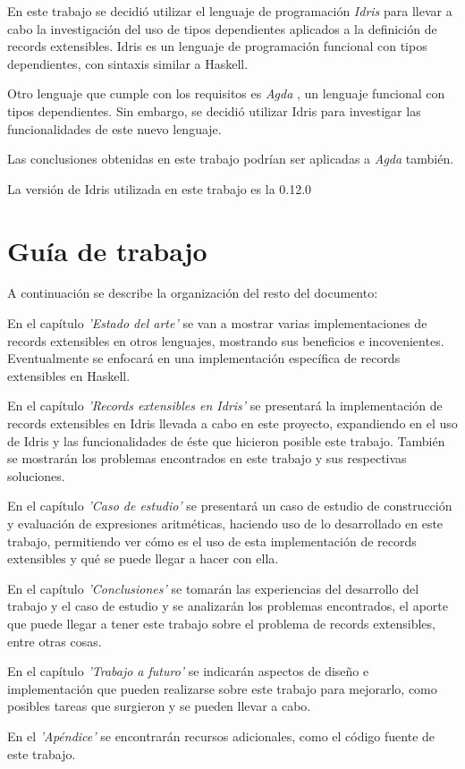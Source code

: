 En este trabajo se decidió utilizar el lenguaje de programación \textit{Idris} \cite{brady:idris-jfp13} para llevar a cabo la investigación del uso de tipos dependientes aplicados a la definición de records extensibles. Idris es un lenguaje de programación funcional con tipos dependientes, con sintaxis similar a Haskell.

Otro lenguaje que cumple con los requisitos es \textit{Agda} \cite{Norell:2009:DTP:1481861.1481862}, un lenguaje funcional con tipos dependientes. Sin embargo, se decidió utilizar Idris para investigar las funcionalidades de este nuevo lenguaje.

Las conclusiones obtenidas en este trabajo podrían ser aplicadas a \textit{Agda} también.

La versión de Idris utilizada en este trabajo es la 0.12.0

\section{Guía de trabajo}

A continuación se describe la organización del resto del documento:

En el capítulo \textit{'Estado del arte'} se van a mostrar varias implementaciones de records extensibles en otros lenguajes, mostrando sus beneficios e incovenientes. Eventualmente se enfocará en una implementación específica de records extensibles en Haskell.

En el capítulo \textit{'Records extensibles en Idris'} se presentará la implementación de records extensibles en Idris llevada a cabo en este proyecto, expandiendo en el uso de Idris y las funcionalidades de éste que hicieron posible este trabajo. También se mostrarán los problemas encontrados en este trabajo y sus respectivas soluciones.

En el capítulo \textit{'Caso de estudio'} se presentará un caso de estudio de construcción y evaluación de expresiones aritméticas, haciendo uso de lo desarrollado en este trabajo, permitiendo ver cómo es el uso de esta implementación de records extensibles y qué se puede llegar a hacer con ella.

En el capítulo \textit{'Conclusiones'} se tomarán las experiencias del desarrollo del trabajo y el caso de estudio y se analizarán los problemas encontrados, el aporte que puede llegar a tener este trabajo sobre el problema de records extensibles, entre otras cosas.

En el capítulo \textit{'Trabajo a futuro'} se indicarán aspectos de diseño e implementación que pueden realizarse sobre este trabajo para mejorarlo, como posibles tareas que surgieron y se pueden llevar a cabo.

En el \textit{'Apéndice'} se encontrarán recursos adicionales, como el código fuente de este trabajo.

